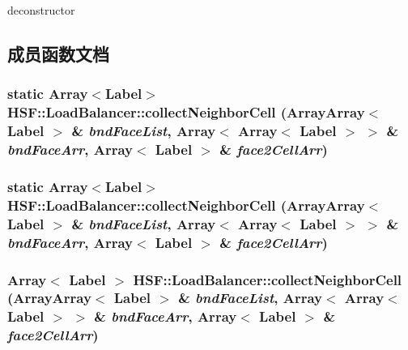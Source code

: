 deconstructor 

\subsection{成员函数文档}
\hypertarget{classHSF_1_1LoadBalancer_a459b7a6b19fccba53c7c6bd5d6ff60a2}{
\subsubsection[{collectNeighborCell}]{\setlength{\rightskip}{0pt plus 5cm}static Array$<${\bf Label}$>$ HSF::LoadBalancer::collectNeighborCell ({\bf ArrayArray}$<$ {\bf Label} $>$ \& {\em bndFaceList}, \/  Array$<$ Array$<$ {\bf Label} $>$ $>$ \& {\em bndFaceArr}, \/  Array$<$ {\bf Label} $>$ \& {\em face2CellArr})}}
\label{classHSF_1_1LoadBalancer_a459b7a6b19fccba53c7c6bd5d6ff60a2}
\hypertarget{classHSF_1_1LoadBalancer_a459b7a6b19fccba53c7c6bd5d6ff60a2}{
\subsubsection[{collectNeighborCell}]{\setlength{\rightskip}{0pt plus 5cm}static Array$<${\bf Label}$>$ HSF::LoadBalancer::collectNeighborCell ({\bf ArrayArray}$<$ {\bf Label} $>$ \& {\em bndFaceList}, \/  Array$<$ Array$<$ {\bf Label} $>$ $>$ \& {\em bndFaceArr}, \/  Array$<$ {\bf Label} $>$ \& {\em face2CellArr})}}
\label{classHSF_1_1LoadBalancer_a459b7a6b19fccba53c7c6bd5d6ff60a2}
\hypertarget{classHSF_1_1LoadBalancer_af816897dbfedc38b2d56b756f9f31a09}{
\subsubsection[{collectNeighborCell}]{\setlength{\rightskip}{0pt plus 5cm}Array$<$ {\bf Label} $>$ HSF::LoadBalancer::collectNeighborCell ({\bf ArrayArray}$<$ {\bf Label} $>$ \& {\em bndFaceList}, \/  Array$<$ Array$<$ {\bf Label} $>$ $>$ \& {\em bndFaceArr}, \/  Array$<$ {\bf Label} $>$ \& {\em face2CellArr})}}
\label{classHSF_1_1LoadBalancer_af816897dbfedc38b2d56b756f9f31a09}


